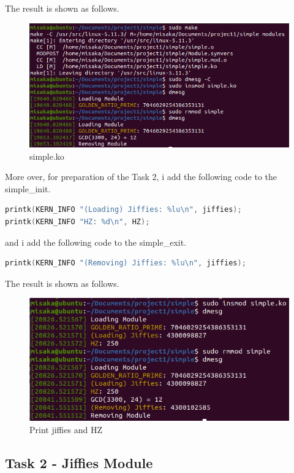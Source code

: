 \documentclass[UTF8,10pt,a4paper]{article}
\theoremstyle{Problem}
\theoremstyle{Solution}
\begin{document}
The result is shown as follows.
\begin{figure}[H]
    \centering
    \includegraphics[width=380pt]{simple1.png}
    \caption{simple.ko}
    \label{88}
\end{figure}


More over, for preparation of the Task 2, i add the following code to the simple\_init.
\begin{lstlisting}[language = c]
printk(KERN_INFO "(Loading) Jiffies: %lu\n", jiffies);
printk(KERN_INFO "HZ: %d\n", HZ);
\end{lstlisting}

and i add the following code to the simple\_exit.
\begin{lstlisting}[language = c]
printk(KERN_INFO "(Removing) Jiffies: %lu\n", jiffies);
\end{lstlisting}

The result is shown as follows.
\begin{figure}[H]
    \centering
    \includegraphics[width=380pt]{simple2.png}
    \caption{Print jiffies and HZ}
    \label{7}
\end{figure}

\subsection{Task 2 - Jiffies Module}
\end{document}
